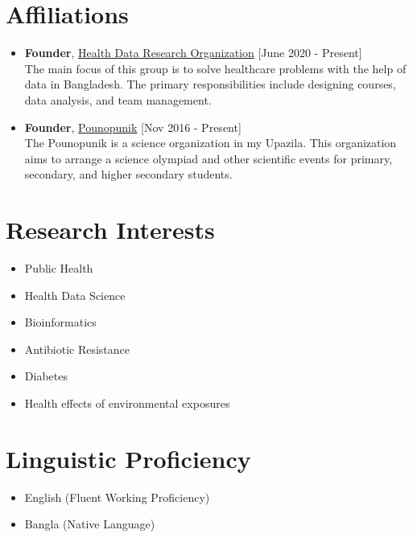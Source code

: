 \documentclass[11pt,a4paper]{moderncv}
\begin{document}
\section{Affiliations}
\begin{itemize}
	\item \textbf{Founder}, 
	\textcolor{blue}{\href{https://hdrobd.org/}{Health Data Research 
	Organization}}
	\hfill [June 2020 - Present]\\ 
	The main focus of this group is to solve healthcare problems with the help 
	of data in Bangladesh. The primary responsibilities include designing 
	courses, data analysis, and team management.
	\item \textbf{Founder}, 
	\textcolor{blue}{\href{}{Pounopunik}}
	\hfill [Nov 2016 - Present]\\
	The Pounopunik is a science organization in my Upazila. This organization 
	aims to arrange a science olympiad and other scientific events for primary, 
	secondary, and higher secondary students. 

\end{itemize}

\section{Research Interests}

\begin{multicols}{2}
	\begin{itemize}
		\item Public Health
		\item Health Data Science
		\item Bioinformatics
	\end{itemize}
	\columnbreak 
	\begin{itemize}
		\item Antibiotic Resistance
		\item Diabetes
		\item Health effects of environmental exposures 
	\end{itemize}

\end{multicols} 

\section{Linguistic Proficiency}
\begin{itemize}  	
	\item English (Fluent Working Proficiency)
	\item Bangla (Native Language)
\end{itemize}
\end{document}
